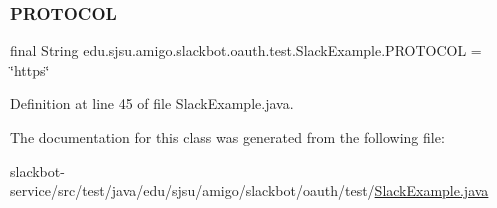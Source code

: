 \subsubsection{\texorpdfstring{P\+R\+O\+T\+O\+C\+OL}{PROTOCOL}}
{\footnotesize\ttfamily final String edu.\+sjsu.\+amigo.\+slackbot.\+oauth.\+test.\+Slack\+Example.\+P\+R\+O\+T\+O\+C\+OL = \char`\"{}https\char`\"{}\hspace{0.3cm}{\ttfamily [static]}}



Definition at line 45 of file Slack\+Example.\+java.



The documentation for this class was generated from the following file\+:\begin{DoxyCompactItemize}
\item 
slackbot-\/service/src/test/java/edu/sjsu/amigo/slackbot/oauth/test/\hyperlink{_slack_example_8java}{Slack\+Example.\+java}\end{DoxyCompactItemize}
